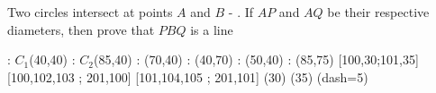 
%
%
%
%
% 
% 

\question[2] Two circles intersect at points $A$ and $B$ - \asif. If $AP$ and $AQ$ be their 
respective diameters, then prove that $PBQ$ is a line


  \begin{marginfigure}
    	: $C_1$(40,40)
    	: $C_2$(85,40)
      : (70,40) %
      : (40,70) %
      : (50,40) %
      : (85,75)
       [100,30;101,35] %
       [100,102,103 ; 201,100] %
       [101,104,105 ; 201,101] %
    \figdrawbegin{}
      (30)
      (35)
      \figdrawline [201,301]
      \figdrawline [201,311]
      \figdrawline [301,311]
      \ifprintanswers
        \figset (dash=5)
        \figdrawline [201,200]
      \fi
    \figdrawend
    \centerline{\box\figBoxA}
  \end{marginfigure} 

